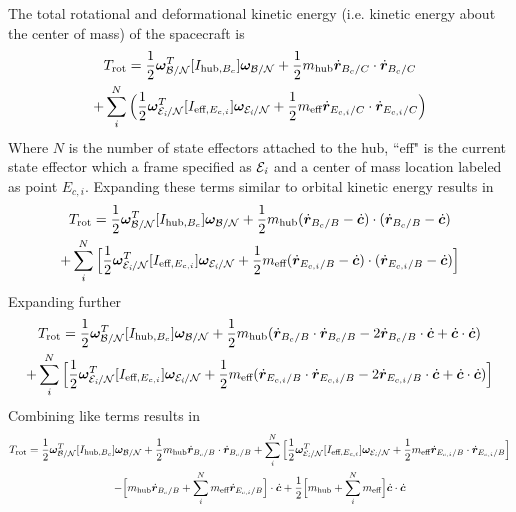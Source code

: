The total rotational and deformational kinetic energy (i.e. kinetic energy about the center of mass) of the spacecraft is
\begin{multline}
T_{\text{rot}} = \frac{1}{2} \bm \omega_{\cal{B/N}}^T [I_{\text{hub},B_c}] \bm \omega_{\cal{B/N}} + \frac{1}{2} m_{\text{hub}} \dot{\bm r}_{B_c/C} \cdot \dot{\bm r}_{B_c/C} \\
+ \sum\limits_{i}^{N}\Big(\frac{1}{2} \bm \omega_{\cal{E}_{\textit{i}}/\cal{N}}^T [I_{\text{eff},E_{c,i}}] \bm \omega_{\cal{E}_{\textit{i}}/\cal{N}}
+ \frac{1}{2} m_{\text{eff}} \dot{\bm r}_{E_{c,i}/C} \cdot \dot{\bm r}_{E_{c,i}/C}\Big)
\end{multline}
Where $N$ is the number of state effectors attached to the hub, ``eff" is the current state effector which a frame specified as $\cal{E}_{\textit{i}}$ and a center of mass location labeled as point $E_{c,i}$. Expanding these terms similar to orbital kinetic energy results in 
\begin{multline}
T_{\text{rot}} = \frac{1}{2} \bm \omega_{\cal{B/N}}^T [I_{\text{hub},B_c}] \bm \omega_{\cal{B/N}} + \frac{1}{2} m_{\text{hub}} (\dot{\bm r}_{B_c/B} - \dot{\bm c}) \cdot (\dot{\bm r}_{B_c/B} - \dot{\bm c}) \\
+ \sum\limits_{i}^{N}\Big[\frac{1}{2} \bm \omega_{\cal{E}_{\textit{i}}/\cal{N}}^T [I_{\text{eff},E_{c,i}}] \bm \omega_{\cal{E}_{\textit{i}}/\cal{N}}
+ \frac{1}{2} m_{\text{eff}} (\dot{\bm r}_{E_{c,i}/B} - \dot{\bm c}) \cdot (\dot{\bm r}_{E_{c,i}/B} - \dot{\bm c})\Big]
\end{multline}
Expanding further
\begin{multline}
T_{\text{rot}} = \frac{1}{2} \bm \omega_{\cal{B/N}}^T [I_{\text{hub},B_c}] \bm \omega_{\cal{B/N}} + \frac{1}{2} m_{\text{hub}} (\dot{\bm r}_{B_c/B}\cdot\dot{\bm r}_{B_c/B} - 2 \dot{\bm r}_{B_c/B} \cdot \dot{\bm c}  + \dot{\bm c} \cdot \dot{\bm c}) \\
+ \sum\limits_{i}^{N}\Big[\frac{1}{2} \bm \omega_{\cal{E}_{\textit{i}}/\cal{N}}^T [I_{\text{eff},E_{c,i}}] \bm \omega_{\cal{E}_{\textit{i}}/\cal{N}}
+ \frac{1}{2} m_{\text{eff}} (\dot{\bm r}_{E_{c,i}/B} \cdot \dot{\bm r}_{E_{c,i}/B} - 2 \dot{\bm r}_{E_{c,i}/B} \cdot \dot{\bm c} + \dot{\bm c} \cdot \dot{\bm c})\Big]
\end{multline}
Combining like terms results in
\begin{multline}
T_{\text{rot}} = \frac{1}{2} \bm \omega_{\cal{B/N}}^T [I_{\text{hub},B_c}] \bm \omega_{\cal{B/N}} + \frac{1}{2} m_{\text{hub}} \dot{\bm r}_{B_c/B}\cdot\dot{\bm r}_{B_c/B} + \sum\limits_{i}^{N}\Big[\frac{1}{2} \bm \omega_{\cal{E}_{\textit{i}}/\cal{N}}^T [I_{\text{eff},E_{c,i}}] \bm \omega_{\cal{E}_{\textit{i}}/\cal{N}}
+ \frac{1}{2} m_{\text{eff}}\dot{\bm r}_{E_{c,i}/B} \cdot \dot{\bm r}_{E_{c,i}/B} \Big]\\
- \Big[ m_{\text{hub}} \dot{\bm r}_{B_c/B} + \sum\limits_{i}^{N} m_{\text{eff}} \dot{\bm r}_{E_{c,i}/B} \Big] \cdot \dot{\bm c} + \frac{1}{2} \Big[m_{\text{hub}} + \sum\limits_{i}^{N} m_{\text{eff}} \Big]\dot{\bm c} \cdot \dot{\bm c}
\end{multline}
